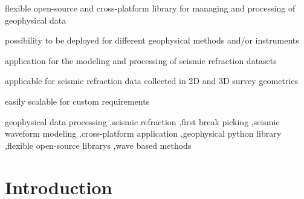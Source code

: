 \documentclass[a4paper,fleqn]{cas-sc}
\begin{document}
\begin{highlights}
\item flexible open-source and cross-platform library for managing and processing of geophysical data
\item possibility to be deployed for different geophysical methods and/or instruments
\item application for the modeling and processing of seismic refraction datasets
\item applicable for seismic refraction data collected in 2D and 3D survey geometries
\item easily scalable for custom requirements
\end{highlights}

\begin{keywords}
geophysical data processing \sep seismic refraction \sep first break picking \sep seismic waveform modeling \sep cross-platform application \sep geophysical python library \sep flexible open-source librarys \sep wave based methods
\end{keywords}

\maketitle 

\printcredits

\doublespacing

\section{Introduction}
\label{intro}
\end{document}
